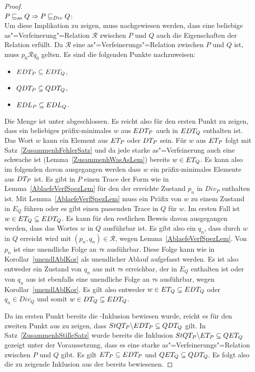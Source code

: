 \begin{proof}\mbox{}\\
  $P \sqsubseteq _{\mathrm{as}} Q \Rightarrow P  \sqsubseteq  _{Div} Q$:\\
  Um diese Implikation zu zeigen, muss nachgewiesen werden, dass eine beliebige
  as"=Verfeinerung"=Relation $\mathcal{R}$ zwischen $P$ und $Q$ auch die
  Eigenschaften der Relation \DRel{} erfüllt. Da $\mathcal{R}$ eine
  as"=Verfeinerungs"=Relation zwischen $P$ und $Q$ ist, muss $p_0 \mathcal{R}
  q_0$ gelten. Es sind die folgenden Punkte nachzuweisen:
  \begin{itemize}
    \item $EDT _P \subseteq EDT _Q$,
    \item $QDT _P \subseteq QDT _Q$,
    \item $EDL _P \subseteq EDL _Q$.
  \end{itemize}

  Die Menge \EDT{} ist unter \cont{} abgeschlossen. Es reicht also für den
  ersten Punkt zu zeigen, dass ein beliebiges präfix-minimales $w$ aus $EDT
  _P$ auch in $EDT _Q$ enthalten ist. Das Wort $w$ kann ein Element aus $ET
  _P$ oder $DT _P$ sein. Für $w$ aus $ET _P$ folgt mit
  Satz~\ref{ZusammenhFehlerSatz} und da jede starke as"=Verfeinerung auch eine
  schwache ist (Lemma~\ref{ZusammenhWasAsLem}) bereits $w\in ET _Q$. Es kann
  also im folgenden davon ausgegangen werden dass $w$ ein präfix-minimales
  Elemente aus $DT _P$ ist. Es gibt in $P$ einen Trace der Form wie in
  Lemma~\ref{AblaefeVerfSpezLem} für den der erreichte Zustand $p_n$ in $Div_P$
  enthalten ist. Mit Lemma~\ref{AblaefeVerfSpezLem} muss ein Präfix von $w$ zu
  einem Zustand in $E_Q$ führen oder es gibt einen passenden Trace in $Q$ für
  $w$. Im ersten Fall ist $w\in ET _Q \subseteq EDT _Q$. Es kann für den
  restlichen Beweis davon ausgegangen werden, dass das Wortes $w$ in $Q$
  ausführbar ist. Es gibt also ein $q_n$, dass durch $w$ in $Q$ erreicht wird
  mit $(p_n,q_n)\in\mathcal{R}$, wegen Lemma~\ref{AblaefeVerfSpezLem}. Von
  $p_n$ ist eine unendliche Folge an $\tau$s ausführbar. Diese Folge kann wie
  in Korollar~\ref{unendlAblKor} als unendlicher Ablauf aufgefasst werden. Es
  ist also entweder ein Zustand von $q_n$ aus mit $\tau$s erreichbar, der in
  $E_Q$ enthalten ist oder von $q_n$ aus ist ebenfalls eine unendliche Folge an
  $\tau$s ausführbar, wegen Korollar~\ref{unendlAblKor}. Es gilt also
  entweder $w\in ET _Q\subseteq EDT _Q$ oder $q_n\in Div _Q$ und somit $w\in DT
  _Q\subseteq EDT _Q$.

  Da im ersten Punkt bereits die \EDT{}-Inklusion bewiesen wurde, reicht es
  für den zweiten Punkt aus zu zeigen, dass $StQT _P\backslash EDT _P
  \subseteq QDT _Q$ gilt. In Satz~\ref{ZusammenhStilleSatz} wurde bereits die
  Inklusion $StQT _P \backslash ET _P \subseteq QET _Q$ gezeigt unter der
  Voraussetzung, dass es eine starke as"=Verfeinerungs"=Relation zwischen
  $P$ und $Q$ gibt. Es gilt $ET _P \subseteq EDT _P$ und $QET _Q \subseteq
  QDT _Q$. Es folgt also die zu zeigende Inklusion aus der bereits bewiesenen.


\end{proof}
